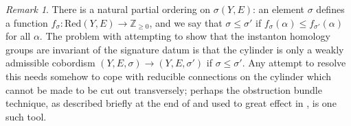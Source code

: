\documentclass{memo-l}
\theoremstyle{definition}
\theoremstyle{remark}
\newtheorem{remark}[theorem]{Remark}
\numberwithin{section}{chapter}
\numberwithin{equation}{chapter}
\begin{document}
\begin{remark}There is a natural partial ordering on $\sigma(Y,E)$: an element $\sigma$ defines a function $f_\sigma: \text{Red}(Y, E) \to \mathbb Z_{\geq 0}$, and we say that $\sigma \leq \sigma'$ if $f_\sigma(\alpha) \leq f_{\sigma'}(\alpha)$ for all $\alpha$. The problem with attempting to show that the instanton homology groups are invariant of the signature datum is that the cylinder is only a weakly admissible cobordism $(Y, E, \sigma) \to (Y, E, \sigma')$ if $\sigma \leq \sigma'$. Any attempt to resolve this needs somehow to cope with reducible connections on the cylinder which cannot be made to be cut out transversely; perhaps the obstruction bundle technique, as described briefly at the end of \cite{Don} and used to great effect in \cite{taubes1984self}, is one such tool.
\end{remark}
\end{document}
